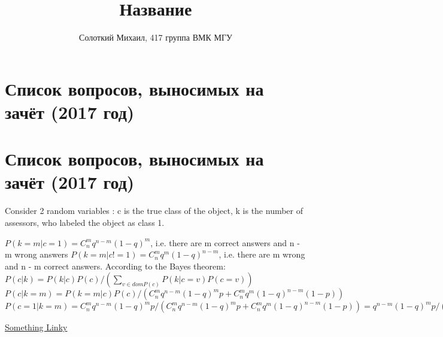 \documentclass[10pt]{extarticle}
\title{Название}
\author{Солоткий Михаил, 417 группа ВМК МГУ}
\begin{document}
\maketitle
    \section*{Список вопросов, выносимых на зачёт (2017 год)}
    \section{Список вопросов, выносимых на зачёт (2017 год)}

    \cite{paper}

    
    

    Consider 2 random variables : c is the true class of the object, k is the number of assessors, who labeled the object as class 1.

    $P(k = m | c = 1) = C_n^m  q^{n - m}  (1 - q)^{m}$, i.e. there are m correct answers and n - m wrong answers
    $P(k = m | c != 1) = C_n^m  q^{m}  (1 - q)^{n - m}$, i.e. there are m wrong and n - m correct answers.
    According to the Bayes theorem: $P(c | k) = P(k | c) P(c)  /  ( \sum_{v \in dom P(c)}  P(k | c = v) P(c = v) )$
    $P(c | k = m) = P(k = m | c) P(c)  /  (C_n^m  q^{n - m}  (1 - q)^{m}  p +  C_n^m  q^{m}  (1 - q)^{n - m}  (1 - p) )$
    $P(c = 1 | k = m) = C_n^m  q^{n - m}  (1 - q)^{m}  p  /  (C_n^m  q^{n - m}  (1 - q)^{m}  p +  C_n^m  q^{m}  (1 - q)^{n - m}  (1 - p) ) = q^{n - m}  (1 - q)^{m} p  /  ( q^{n - m}  (1 - q)^{m} p  +  q^{m}  (1 - q)^{n - m}) (1 - p) )$

    \href{http://www.sharelatex.com}{Something Linky}
\end{document}
